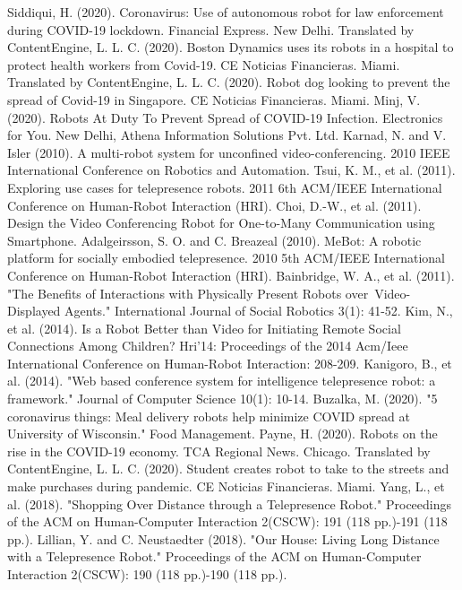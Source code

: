 \documentclass[a4paper]{article}
\begin{document}
\begin{thebibliography}{99}
    Siddiqui, H. (2020). Coronavirus: Use of autonomous robot for law enforcement during COVID-19 lockdown. Financial Express. New Delhi.
    Translated by ContentEngine, L. L. C. (2020). Boston Dynamics uses its robots in a hospital to protect health workers from Covid-19. CE Noticias Financieras. Miami.
    Translated by ContentEngine, L. L. C. (2020). Robot dog looking to prevent the spread of Covid-19 in Singapore. CE Noticias Financieras. Miami.
    Minj, V. (2020). Robots At Duty To Prevent Spread of COVID-19 Infection. Electronics for You. New Delhi, Athena Information Solutions Pvt. Ltd.
    Karnad, N. and V. Isler (2010). A multi-robot system for unconfined video-conferencing. 2010 IEEE International Conference on Robotics and Automation.
    Tsui, K. M., et al. (2011). Exploring use cases for telepresence robots. 2011 6th ACM/IEEE International Conference on Human-Robot Interaction (HRI).
    Choi, D.-W., et al. (2011). Design the Video Conferencing Robot for One-to-Many Communication using Smartphone.
    Adalgeirsson, S. O. and C. Breazeal (2010). MeBot: A robotic platform for socially embodied telepresence. 2010 5th ACM/IEEE International Conference on Human-Robot Interaction (HRI).
    Bainbridge, W. A., et al. (2011). "The Benefits of Interactions with Physically Present Robots over Video-Displayed Agents." International Journal of Social Robotics 3(1): 41-52.
    Kim, N., et al. (2014). Is a Robot Better than Video for Initiating Remote Social Connections Among Children? Hri'14: Proceedings of the 2014 Acm/Ieee International Conference on Human-Robot Interaction: 208-209.
    Kanigoro, B., et al. (2014). "Web based conference system for intelligence telepresence robot: a framework." Journal of Computer Science 10(1): 10-14.
    Buzalka, M. (2020). "5 coronavirus things: Meal delivery robots help minimize COVID spread at University of Wisconsin." Food Management.
    Payne, H. (2020). Robots on the rise in the COVID-19 economy. TCA Regional News. Chicago.
	Translated by ContentEngine, L. L. C. (2020). Student creates robot to take to the streets and make purchases during pandemic. CE Noticias Financieras. Miami.
    Yang, L., et al. (2018). "Shopping Over Distance through a Telepresence Robot." Proceedings of the ACM on Human-Computer Interaction 2(CSCW): 191 (118 pp.)-191 (118 pp.).
    Lillian, Y. and C. Neustaedter (2018). "Our House: Living Long Distance with a Telepresence Robot." Proceedings of the ACM on Human-Computer Interaction 2(CSCW): 190 (118 pp.)-190 (118 pp.).

\end{thebibliography}
\end{document}
